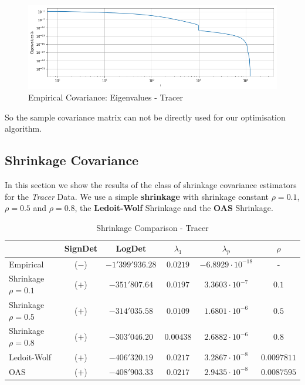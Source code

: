 \begin{figure}[h!]
\centering
    \includegraphics[width=0.7\linewidth]{figures/Covariance/Tracer_23643/cov_emp_eigenval_loglog}
    \caption{Empirical Covariance: Eigenvalues - Tracer}
    \label{fig:cov:emp:eigs}
\end{figure}

So the sample covariance matrix can not be directly used for our optimisation algorithm.  

\subsection{Shrinkage Covariance}

In this section we show the results of the class of shrinkage covariance estimators for the \textit{Tracer} Data. We use a simple \textbf{shrinkage} with shrinkage constant $\rho = 0.1$,  $\rho = 0.5$ and $\rho = 0.8$,  the \textbf{Ledoit-Wolf} Shrinkage and the \textbf{OAS} Shrinkage. 

\begin{table}[h]
\centering
    \begin{tabular}{l|ccccc}
     \toprule
        & SignDet & LogDet & $\lambda_1$ & $\lambda_p$ & $\rho$ \\ \midrule
        Empirical & ($-$) & $-1'399'936.28$ &  $0.0219$ & $-6.8929 \cdot 10^{-18}$ & -\\
        Shrinkage $\rho=0.1$ & ($+$) & $-351'807.64$ &  $0.0197$ &$3.3603\cdot 10^{-7}$ & $0.1$\\
        Shrinkage $\rho=0.5$ & ($+$) & $-314'035.58$ &  $0.0109$  &$1.6801 \cdot 10^{-6}$ & $0.5$\\
        Shrinkage $\rho=0.8$ & ($+$) & $-303'046.20$ &  $0.00438$  &$2.6882 \cdot 10^{-6}$ & $0.8$\\
        Ledoit-Wolf & ($+$) & $-406'320.19$&  $0.0217$ & $3.2867\cdot 10^{-8}$ & $0.0097811$\\
        OAS & ($+$) & $-408'903.33$ & $0.0217$ & $2.9435\cdot 10^{-8}$ & $0.0087595$ \\  \bottomrule
    \end{tabular}
    \caption{Shrinkage Comparison - Tracer}
\end{table}

